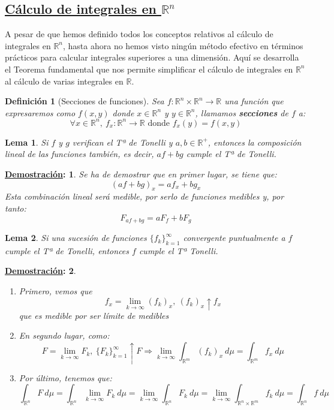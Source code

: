 \documentclass[10pt,a4paper,openright]{book}
\theoremstyle{break}
\newtheorem*{defi}{Definición}
\newtheorem*{lema}{Lema}
\newtheorem*{demo}{\underline{Demostración}:}
\newcommand{\dif}[1]{\ d#1}
\begin{document}
\subsection*{\underline{Cálculo de integrales en $\mathbb{R}^n$}}
A pesar de que hemos definido todos los conceptos relativos al cálculo de integrales en $\mathbb{R}^n$, hasta ahora no hemos visto ningún método efectivo en términos prácticos para calcular integrales superiores a una dimensión. Aquí se desarrolla el Teorema fundamental que nos permite simplificar el cálculo de integrales en $\mathbb{R}^n$ al cálculo de varias integrales en $\mathbb{R}$.

\begin{defi}[Secciones de funciones]
Sea $f: \mathbb{R}^{n} \times \mathbb{R}^n \rightarrow \mathbb{R}$ una función que expresaremos como $f \left(x, y\right)$ donde $x \in \mathbb{R}^n$ y $y \in \mathbb{R}^n$, llamamos \textbf{secciones} de $f$ a:
$$\forall x \in \mathbb{R}^n, \ f_x: \mathbb{R}^n \rightarrow \mathbb{R} \mbox{ donde } f_x \left(y\right) = f \left(x, y\right)$$
\end{defi}

\begin{lema}
Si $f$ y $g$ verifican el Tª de Tonelli y $a, b \in \mathbb{R}^+$, entonces la composición lineal de las funciones también, es decir, $af + bg$ cumple el Tª de Tonelli.
\end{lema}
\begin{demo}
Se ha de demostrar que en primer lugar, se tiene que:
$$\left(af + bg\right)_x = af_x + bg_x$$
Esta combinación lineal será medible, por serlo de funciones medibles y, por tanto:
$$F_{af + bg} = aF_f + bF_g$$ 
\end{demo}

\begin{lema}
Si una sucesión de funciones $\{f_k\}_{k=1}^{\infty}$ convergente puntualmente a $f$ cumple el Tª de Tonelli, entonces $f$ cumple el Tª Tonelli. 
\end{lema}
\begin{demo}
\begin{enumerate}
    \item Primero, vemos que
    $$f_x = \lim_{k \rightarrow \infty} \left(f_k\right)_x,\ \left(f_k\right)_x \uparrow f_x $$
    que es medible por ser límite de medibles
    \item En segundo lugar, como: 
    $$F = \lim_{k \rightarrow \infty}F_k,\ \{F_k\}_{k=1}^{\infty} \uparrow F \Rightarrow\lim_{k \rightarrow \infty} \int_{\mathbb{R}^m} \left(f_k\right)_x \dif{\mu} = \int_{\mathbb{R}^m} f_x \dif{\mu} $$
    \item Por último, tenemos que: 
    $$\int_{\mathbb{R}^n} F \dif{\mu} = \int_{\mathbb{R}^n} \lim_{k \rightarrow \infty}F_k  \dif{\mu} = \lim_{k \rightarrow \infty}\int_{\mathbb{R}^n} F_k \dif{\mu} = \lim_{k \rightarrow \infty} \int_{\mathbb{R}^n \times \mathbb{R}^m} f_k  \dif{\mu} = \int_{\mathbb{R}^n} f \dif{\mu}  $$
\end{enumerate}
\end{demo}
\end{document}

